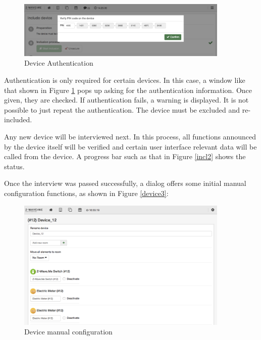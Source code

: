 \begin{figure}
\begin{center}
\includegraphics[width=0.9\textwidth]{pngs/cap4/SHUI_S2AUTH.png}
\caption{\zwave Device Authentication}
\label{security2_6}
\end{center}
\end{figure}

Authentication is only required for certain devices. In this case, a 
window like that shown in Figure \ref{security2_6} pops up asking for the authentication 
information. Once given, they are checked. If authentication fails, a warning is 
displayed. It is not possible to just repeat the authentication. The 
device must be excluded and re-included.


Any new device will be interviewed next. In this process, all functions announced by 
the device itself will be verified and certain user interface relevant data will be called 
from the device. A progress bar such as that in Figure \ref{incl2} shows the status.

Once the interview was passed successfully, a dialog offers some initial manual configuration 
functions, as shown in Figure \ref{device3}:

\begin{figure}
\begin{center}
\includegraphics[width=0.9\textwidth]{pngs/cap4/incl3.png}
\caption{\zwave Device manual configuration}
\label{incl3}
\end{center}
\end{figure}

